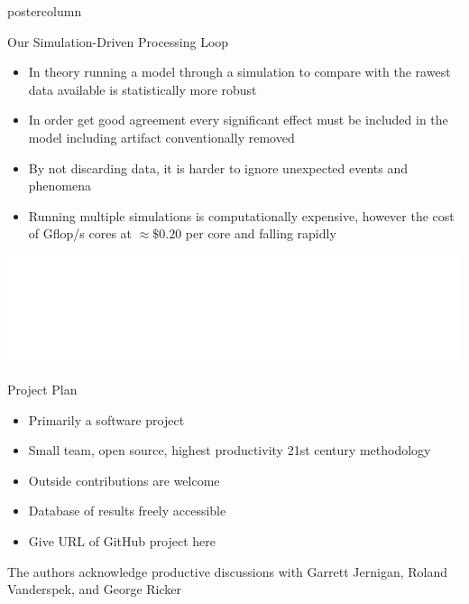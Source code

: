 \documentclass[final,hyperref={pdfpagelabels=false}]{beamer}
\begin{document}
\begin{frame}
\begin{columns}
\begin{column}{.49\textwidth}
\begin{beamercolorbox}[center,wd=\textwidth]{postercolumn}
\begin{minipage}[T]{.95\textwidth}
{            \vspace{2cm}
            \begin{block}{Our Simulation-Driven Processing Loop}
            \begin{itemize}
            \item  In theory running a model through a simulation to compare with the rawest data available is statistically more robust
            \item In order get good agreement every significant effect must be included in the model including artifact conventionally removed
            \item By not discarding data, it is harder to ignore unexpected events and phenomena
            \item Running multiple simulations is computationally expensive, however the cost of Gflop/s cores at  $\approx\$0.20$ per core and falling rapidly
            \end{itemize}
              \begin{center}
              \includegraphics[width=0.75\linewidth]{figures/Our_Pipeline.pdf}
              \end{center}
            \end{block}
            \begin{block}{Project Plan}
            \begin{itemize}
		\item Primarily a software project
		\item Small team, open source, highest productivity 21st century methodology
		\item Outside contributions are welcome
		\item Database of results freely accessible
		\item Give URL of GitHub project here
	    \end{itemize}
	    \vspace{1cm}
The authors acknowledge productive discussions with Garrett Jernigan, Roland Vanderspek, and George Ricker
            \end{block}
          }
        \end{minipage}
      \end{beamercolorbox}
    \end{column}


\end{columns}
\end{frame}
\end{document}
